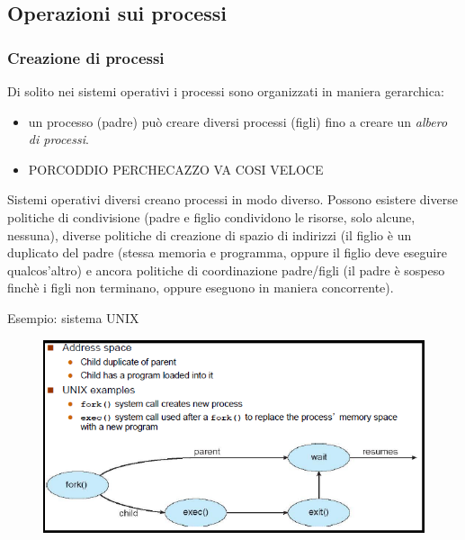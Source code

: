 \documentclass[11pt]{article}
\begin{document}
\subsection{Operazioni sui processi}
\subsubsection{Creazione di processi}
Di solito nei sistemi operativi i processi sono organizzati in maniera gerarchica:
\begin{itemize}
\item un processo (padre) può creare diversi processi (figli) fino a creare un \textit{albero di processi}.
\item PORCODDIO PERCHECAZZO VA COSI VELOCE
\end{itemize}
Sistemi operativi diversi creano processi in modo diverso. Possono esistere diverse politiche di condivisione (padre e figlio condividono le risorse, solo alcune, nessuna), diverse politiche di creazione di spazio di indirizzi (il figlio è un duplicato del padre (stessa memoria e programma, oppure il figlio deve eseguire qualcos'altro) e ancora politiche di coordinazione padre/figli (il padre è sospeso finchè i figli non terminano, oppure eseguono in maniera concorrente).

Esempio: sistema UNIX
\begin{figure}[ht]
\includegraphics[scale=0.8]{UNIX-process.png}
\end{figure}
\end{document}
